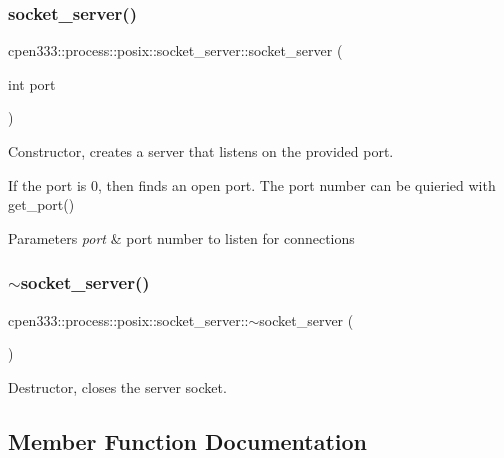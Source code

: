 \subsubsection{\texorpdfstring{socket\+\_\+server()}{socket\_server()}\hspace{0.1cm}{\footnotesize\ttfamily [2/2]}}
{\footnotesize\ttfamily cpen333\+::process\+::posix\+::socket\+\_\+server\+::socket\+\_\+server (\begin{DoxyParamCaption}\item[{int}]{port }\end{DoxyParamCaption})\hspace{0.3cm}{\ttfamily [inline]}}



Constructor, creates a server that listens on the provided port. 

If the port is 0, then finds an open port. The port number can be quieried with get\+\_\+port()


\begin{DoxyParams}{Parameters}
{\em port} & port number to listen for connections \\
\hline
\end{DoxyParams}
\mbox{\label{classcpen333_1_1process_1_1posix_1_1socket__server_a2d07def5c83de193cc2f19c51be31c17}} 
\subsubsection{\texorpdfstring{$\sim$socket\+\_\+server()}{~socket\_server()}}
{\footnotesize\ttfamily cpen333\+::process\+::posix\+::socket\+\_\+server\+::$\sim$socket\+\_\+server (\begin{DoxyParamCaption}{ }\end{DoxyParamCaption})\hspace{0.3cm}{\ttfamily [inline]}}



Destructor, closes the server socket. 



\subsection{Member Function Documentation}
\mbox{\label{classcpen333_1_1process_1_1posix_1_1socket__server_aeab0f2bae871e61dda339bc19279eb7c}} 
